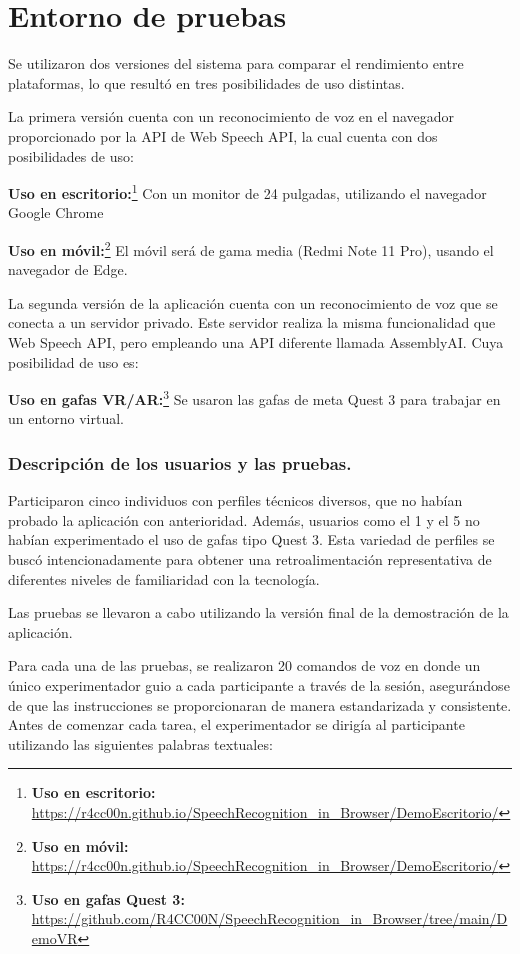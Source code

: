 \documentclass[a4paper, 12pt]{book}
\begin{document}
\section{Entorno de pruebas}

Se utilizaron dos versiones del sistema para comparar el rendimiento entre plataformas, lo que resultó en tres posibilidades de uso distintas.

La primera versión cuenta con un reconocimiento de voz en el navegador proporcionado por la API de Web Speech API, la cual cuenta con dos posibilidades de uso:

\textbf{Uso en escritorio:}\footnote{\scriptsize \textbf{Uso en escritorio:} \url{https://r4cc00n.github.io/SpeechRecognition_in_Browser/DemoEscritorio/}} Con un monitor de 24 pulgadas, utilizando el navegador Google Chrome

\textbf{Uso en móvil:}\footnote{\scriptsize \textbf{Uso en móvil:} \url{https://r4cc00n.github.io/SpeechRecognition_in_Browser/DemoEscritorio/}} El móvil será de gama media (Redmi Note 11 Pro), usando el navegador de Edge.

La segunda versión de la aplicación cuenta con un reconocimiento de voz que se conecta a un servidor privado. Este servidor realiza la misma funcionalidad que Web Speech API, pero empleando una API diferente llamada AssemblyAI. Cuya posibilidad de uso es:

\textbf{Uso en gafas VR/AR:}\footnote{\scriptsize \textbf{Uso en gafas Quest 3:} \url{https://github.com/R4CC00N/SpeechRecognition_in_Browser/tree/main/DemoVR}} Se usaron las gafas de meta Quest 3 para trabajar en un entorno virtual.

\subsubsection{Descripción de los usuarios y las pruebas.}
Participaron cinco individuos con perfiles técnicos diversos, que no habían probado la aplicación con anterioridad. Además, usuarios como el 1 y el 5 no habían experimentado el uso de gafas tipo Quest 3.
Esta variedad de perfiles se buscó intencionadamente para obtener una retroalimentación representativa de diferentes niveles de familiaridad con la tecnología.

Las pruebas se llevaron a cabo utilizando la versión final de la demostración de la aplicación.

Para cada una de las pruebas, se realizaron 20 comandos de voz en donde un único experimentador guio a cada participante a través de la sesión, asegurándose de que las instrucciones se proporcionaran de manera estandarizada y consistente.
Antes de comenzar cada tarea, el experimentador se dirigía al participante utilizando las siguientes palabras textuales:
\end{document}
